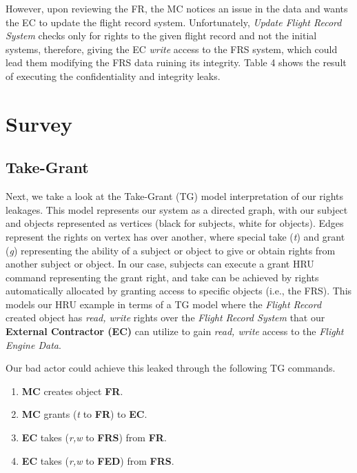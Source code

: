 \documentclass[10pt,journal,compsoc]{IEEEtran}
\begin{document}
  However, upon reviewing the FR, the MC notices an issue in the data and wants the EC to update the flight record system. 
  Unfortunately, \textit{Update Flight Record System} checks only for rights to the given flight record and not the initial systems, therefore, giving the EC \textit{write} access to the FRS system, which could lead them modifying the FRS data ruining its integrity.
  Table 4 shows the result of executing the confidentiality and integrity leaks. 

\section{Survey}

\subsection{Take-Grant}

Next, we take a look at the Take-Grant (TG) model interpretation of our rights leakages. 
This model represents our system as a directed graph, with our subject and objects represented as vertices (black for subjects, white for objects). 
Edges represent the rights on vertex has over another, where special take (\textit{t}) and grant (\textit{g}) representing the ability of a subject or object to give or obtain rights from another subject or object. 
In our case, subjects can execute a grant HRU command representing the grant right, and take can be achieved by rights automatically allocated by granting access to specific objects (i.e., the FRS).
This models our HRU example in terms of a TG model where the \textit{Flight Record} created object has \textit{read, write} rights over the \textit{Flight Record System} that our \textbf{External Contractor (EC)} can utilize to gain \textit{read, write} access to the \textit{Flight Engine Data}.

Our bad actor could achieve this leaked through the following TG commands. 

\begin{enumerate}
  \item \textbf{MC} creates object \textbf{FR}.
  \item \textbf{MC} grants (\textit{t} to \textbf{FR}) to \textbf{EC}.
  \item \textbf{EC} takes (\textit{r,w} to \textbf{FRS}) from \textbf{FR}.
  \item \textbf{EC} takes (\textit{r,w} to \textbf{FED}) from \textbf{FRS}.
\end{enumerate}
\end{document}
